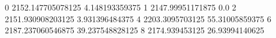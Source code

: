 0 2152.147705078125 4.148193359375
1 2147.99951171875 0.0
2 2151.930908203125 3.931396484375
4 2203.3095703125 55.31005859375
6 2187.237060546875 39.237548828125
8 2174.939453125 26.93994140625
